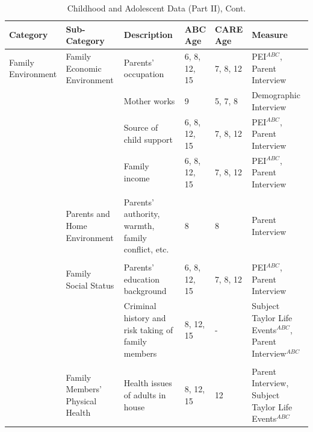 \documentclass[static]{JJH-Beamer}
\begin{document}
\begin{frame}

\begin{table}[H]
\addtocounter{table}{-1}
\caption{Childhood and Adolescent Data (Part II), Cont.}
\begin{center}
\begin{tiny}
\begin{tabular}{L{1.2cm} C{1.4cm} C{2.5cm} C{.9cm} C{.8cm} C{2.9cm}}
\toprule
\textbf{Category}	&	\textbf{Sub-Category}	&	\textbf{Description}	&	\textbf{ABC Age}  	&  \textbf{CARE Age}  & 	\textbf{Measure}	\\ \midrule
Family Environment	&	Family Economic Environment	&	Parents' occupation	&	6, 8, 12, 15	&	7, 8, 12	&	PEI$^{ABC}$, Parent Interview	\\
		&							& Mother works & 9 & 5, 7, 8 & Demographic Interview \\
	&		&	Source of child support	&	6, 8, 12, 15	&	7, 8, 12	&	PEI$^{ABC}$, Parent Interview	\\
	&		&	Family income	&	6, 8, 12, 15	&	7, 8, 12	&	PEI$^{ABC}$, Parent Interview	\\
	&	\\
		&	Parents and Home Environment & Parents' authority, warmth, family conflict, etc. & 8 & 8 & Parent Interview \\
	&	\\
	&	Family Social Status	&	Parents' education background	&	6, 8, 12, 15	&	7, 8, 12	&	PEI$^{ABC}$, Parent Interview	\\
	&		&	Criminal history and risk taking of family members	&	8, 12, 15	&	- 	&	Subject Taylor Life Events$^{ABC}$, Parent Interview$^{ABC}$	\\
	&	\\
	&	Family Members' Physical Health	&	Health issues of adults in house	&	8, 12, 15	&	12	&	Parent Interview, Subject Taylor Life Events$^{ABC}$	\\
\bottomrule
\end{tabular}
\end{tiny}
\end{center}
\end{table}

\end{frame}
\end{document}
